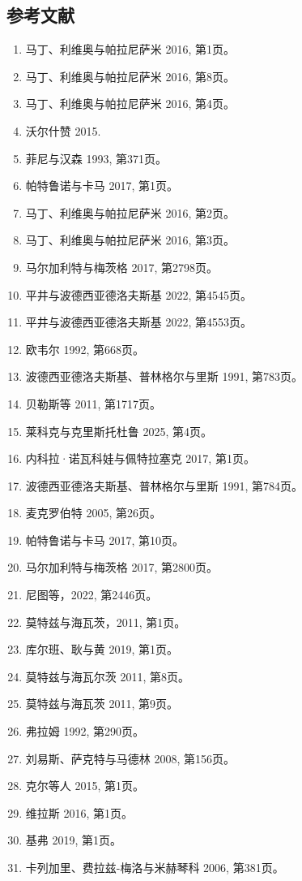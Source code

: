 \subsection{参考文献}
\begin{enumerate}
\item 马丁、利维奥与帕拉尼萨米 2016, 第1页。
\item 马丁、利维奥与帕拉尼萨米 2016, 第8页。
\item 马丁、利维奥与帕拉尼萨米 2016, 第4页。
\item 沃尔什赞 2015.
\item 菲尼与汉森 1993, 第371页。
\item 帕特鲁诺与卡马 2017, 第1页。
\item 马丁、利维奥与帕拉尼萨米 2016, 第2页。
\item 马丁、利维奥与帕拉尼萨米 2016, 第3页。
\item 马尔加利特与梅茨格 2017, 第2798页。
\item 平井与波德西亚德洛夫斯基 2022, 第4545页。
\item 平井与波德西亚德洛夫斯基 2022, 第4553页。
\item 欧韦尔 1992, 第668页。
\item 波德西亚德洛夫斯基、普林格尔与里斯 1991, 第783页。
\item 贝勒斯等 2011, 第1717页。
\item 莱科克与克里斯托杜鲁 2025, 第4页。
\item 内科拉·诺瓦科娃与佩特拉塞克 2017, 第1页。
\item 波德西亚德洛夫斯基、普林格尔与里斯 1991, 第784页。
\item 麦克罗伯特 2005, 第26页。
\item 帕特鲁诺与卡马 2017, 第10页。
\item 马尔加利特与梅茨格 2017, 第2800页。
\item 尼图等，2022, 第2446页。
\item 莫特兹与海瓦茨，2011, 第1页。
\item 库尔班、耿与黄 2019, 第1页。
\item 莫特兹与海瓦尔茨 2011, 第8页。
\item 莫特兹与海瓦茨 2011, 第9页。
\item 弗拉姆 1992, 第290页。
\item 刘易斯、萨克特与马德林 2008, 第156页。
\item 克尔等人 2015, 第1页。
\item 维拉斯 2016, 第1页。
\item 基弗 2019, 第1页。
\item 卡列加里、费拉兹-梅洛与米赫琴科 2006, 第381页。

\end{enumerate}
